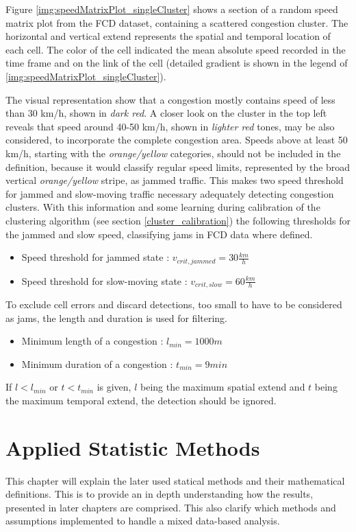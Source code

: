\documentclass[a4paper,headsepline,footsepline,fontsize=11pt,BCOR=12mm,DIV=12]{report}
\begin{document}
Figure \ref{img:speedMatrixPlot_singleCluster} shows a section of a random speed matrix plot from the FCD dataset, containing a scattered congestion cluster. The horizontal and vertical extend represents the spatial and temporal location of each cell. The color of the cell indicated the mean absolute speed recorded in the time frame and on the link of the cell (detailed gradient is shown in the legend of \ref{img:speedMatrixPlot_singleCluster}).

The visual representation show that a congestion mostly contains speed of less than 30 km/h, shown in \textit{dark red}. A closer look on the cluster in the top left reveals that speed around 40-50 km/h, shown in \textit{lighter red} tones, may be also considered, to incorporate the complete congestion area. Speeds above at least 50 km/h, starting with the \textit{orange/yellow} categories, should not be included in the definition, because it would classify regular speed limits, represented by the broad vertical \textit{orange/yellow} stripe, as jammed traffic. This makes two speed threshold for jammed and slow-moving traffic necessary adequately detecting congestion clusters. With this information and some learning during calibration of the clustering algorithm (see section \ref{cluster_calibration}) the following thresholds for the jammed and slow speed, classifying \glspl{jam} in FCD data where defined.

\begin{itemize}
	\item Speed threshold for jammed state : $v_{crit,jammed} = 30 \frac{km}{h}$
	\item Speed threshold for slow-moving state : $v_{crit,slow} = 60 \frac{km}{h}$
\end{itemize}

To exclude cell errors and discard detections, too small to have to be considered as jams, the length and duration is used for filtering. 

\begin{itemize}
	\item Minimum length of a congestion : $l_{min} = 1000 m$
	\item Minimum duration of a congestion : $t_{min} = 9 min$
\end{itemize}

If $l < l_{min}$ or $t < t_{min}$ is given, $l$ being the maximum spatial extend and $t$ being the maximum temporal extend, the detection should be ignored.

\chapter{Applied Statistic Methods}
\label{definition_correlation}
This chapter will explain the later used statical methods and their mathematical definitions. This is to provide an in depth understanding how the results, presented in later chapters are comprised. This also clarify which methods and assumptions implemented to handle a mixed data-based analysis.
\end{document}
